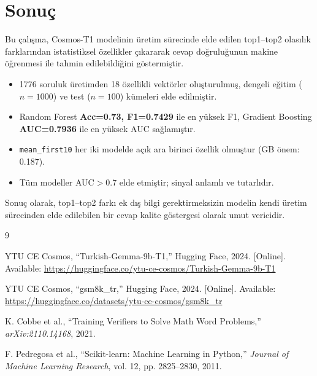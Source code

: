 \documentclass[conference]{IEEEtran}
\begin{document}
\section{Sonuç}

Bu çalışma, Cosmos-T1 modelinin üretim sürecinde elde edilen top1--top2
olasılık farklarından istatistiksel özellikler çıkararak cevap doğruluğunun
makine öğrenmesi ile tahmin edilebildiğini göstermiştir.

\begin{itemize}
  \item 1776 soruluk üretimden 18 özellikli vektörler oluşturulmuş,
        dengeli eğitim ($n=1000$) ve test ($n=100$) kümeleri elde edilmiştir.
  \item Random Forest \textbf{Acc=0.73, F1=0.7429} ile en yüksek F1,
        Gradient Boosting \textbf{AUC=0.7936} ile en yüksek AUC sağlamıştır.
  \item \texttt{mean\_first10} her iki modelde açık ara birinci özellik
        olmuştur (GB önem: 0.187).
  \item Tüm modeller AUC$>$0.7 elde etmiştir; sinyal anlamlı ve tutarlıdır.
\end{itemize}

Sonuç olarak, top1--top2 farkı ek dış bilgi gerektirmeksizin modelin
kendi üretim sürecinden elde edilebilen bir cevap kalite göstergesi
olarak umut vericidir.

\begin{thebibliography}{9}

YTU CE Cosmos, ``Turkish-Gemma-9b-T1,'' Hugging Face, 2024.
[Online]. Available: \url{https://huggingface.co/ytu-ce-cosmos/Turkish-Gemma-9b-T1}

YTU CE Cosmos, ``gsm8k\_tr,'' Hugging Face, 2024.
[Online]. Available: \url{https://huggingface.co/datasets/ytu-ce-cosmos/gsm8k_tr}

K. Cobbe et al., ``Training Verifiers to Solve Math Word Problems,''
\emph{arXiv:2110.14168}, 2021.

F. Pedregosa et al., ``Scikit-learn: Machine Learning in Python,''
\emph{Journal of Machine Learning Research}, vol. 12, pp. 2825--2830, 2011.

\end{thebibliography}
\end{document}
